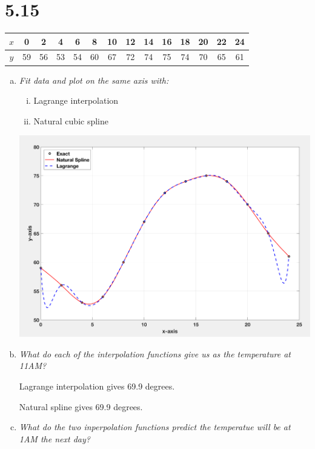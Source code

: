 \documentclass{article}
\begin{document}
\section*{5.15}

\begin{table}[h!]
  \centering
  \begin{tabular}{c | c c c c c c c c c c c c c}
    $x$ & 0 & 2 & 4 & 6 & 8 & 10 & 12 & 14 & 16 & 18 & 20 & 22 & 24 \\
    \hline
    $y$ & 59 & 56 & 53 & 54 & 60 & 67 & 72 & 74 & 75 & 74 & 70 & 65 & 61 \\
  \end{tabular}
\end{table}

\begin{enumerate}[(a)]
  \item \textit{Fit data and plot on the same axis with:}
    \begin{enumerate}[(i)]
      \item Lagrange interpolation
      \item Natural cubic spline
    \end{enumerate}
    \includegraphics[width=\textwidth]{graph.png}
  \item \textit{What do each of the interpolation functions give us as the temperature at 11AM?}
    
    Lagrange interpolation gives 69.9 degrees.

    Natural spline gives 69.9 degrees.
  \item \textit{What do the two inperpolation functions predict the temperatue will be at 1AM the next day?}


\end{enumerate}
\end{document}
